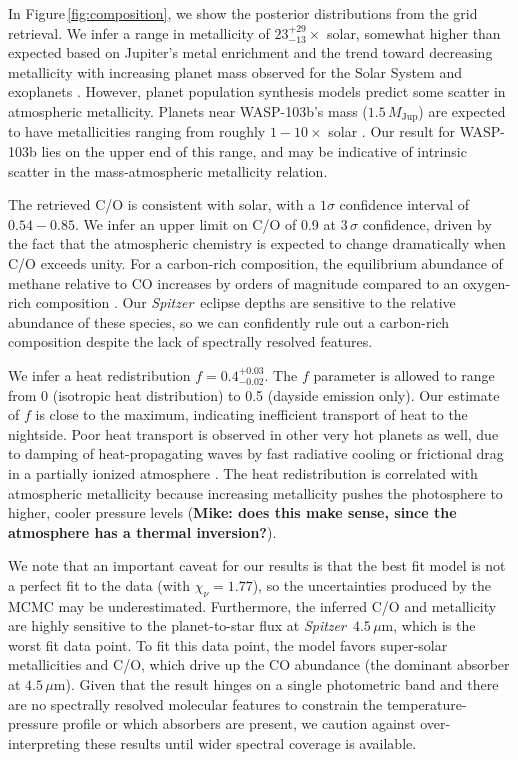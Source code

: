 \documentclass[twocolumn]{aastex61}
\newcommand{\project}[1]{\textsl{#1}}
\newcommand{\Spitzer}{\project{Spitzer}}
\begin{document}
In Figure\,\ref{fig:composition}, we show the posterior distributions from the grid retrieval.  We infer a range in metallicity of $23^{+29}_{-13}\times$ solar, somewhat higher than expected based on Jupiter's metal enrichment \citep[$3-5\times$ solar;][]{wong04} and the trend toward decreasing metallicity with increasing planet mass observed for the Solar System and exoplanets \cite[e.g.][]{kreidberg14b}.  However, planet population synthesis models predict some scatter in atmospheric metallicity. Planets near WASP-103b's mass ($1.5\,M_\mathrm{Jup}$) are expected to have metallicities ranging from roughly $1-10\times$ solar \citep{mordasini16}. Our result for WASP-103b lies on the upper end of this range, and may be indicative of intrinsic scatter in the mass-atmospheric metallicity relation. 

The retrieved C/O is consistent with solar, with a $1\sigma$ confidence interval of $0.54 - 0.85$. We infer an upper limit on C/O of 0.9 at $3\,\sigma$ confidence, driven by the fact that the atmospheric chemistry is expected to change dramatically when C/O exceeds unity. For a carbon-rich composition, the equilibrium abundance of methane relative to CO increases by orders of magnitude compared to an oxygen-rich  composition \citep[e.g.][]{madhusudhan11}. Our \Spitzer\ eclipse depths are sensitive to the relative abundance of these species, so we can confidently rule out a carbon-rich composition despite the lack of spectrally resolved features.  

We infer a heat redistribution $f = 0.4^{+0.03}_{-0.02}$. The $f$ parameter is allowed to range from 0 (isotropic heat distribution) to 0.5 (dayside emission only). Our estimate of $f$ is close to the maximum, indicating inefficient transport of heat to the nightside. Poor heat transport is observed in other very hot planets as well, due to damping of heat-propagating waves by fast radiative cooling or frictional drag in a partially ionized atmosphere \citep{komacek16}. The heat redistribution is correlated with atmospheric metallicity because increasing metallicity pushes the photosphere to higher, cooler pressure levels (\textbf{Mike: does this make sense, since the atmosphere has a thermal inversion?}).

We note that an important caveat for our results is that the best fit model is not a perfect fit to the data (with $\chi_\nu = 1.77$), so the uncertainties produced by the MCMC may be underestimated. Furthermore, the inferred C/O and metallicity are highly sensitive to the planet-to-star flux at \Spitzer\ $4.5\,\mu$m, which is the worst fit data point. To fit this data point, the model favors super-solar metallicities and C/O, which drive up the CO abundance (the dominant absorber at $4.5\,\mu$m). Given that the result hinges on a single photometric band and there are no spectrally resolved molecular features to constrain the temperature-pressure profile or which absorbers are present, we caution against over-interpreting these results until wider spectral coverage is available.
\end{document}
